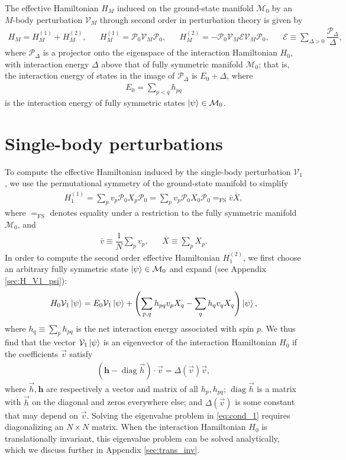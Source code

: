 \documentclass[nofootinbib,notitlepage,11pt]{revtex4-2}
\newcommand{\f}[2]{\dfrac{#1}{#2}} %
\newcommand{\p}[1]{\left(#1\right)} %
\renewcommand{\c}{\cdot} %
\newcommand{\m}{\bm} %
\renewcommand{\v}{\vec} %
\newcommand{\1}{\mathds{1}}
\newcommand{\E}{\mathcal{E}}
\newcommand{\M}{\mathcal{M}}
\renewcommand{\P}{\mathcal{P}}
\newcommand{\V}{\mathcal{V}}
\newcommand{\EQFS}{=_{\text{FS}}}
\newcommand{\col}{\overline}
\DeclareMathOperator{\diag}{diag}
\begin{document}
The effective Hamiltonian $H_M$ induced on the ground-state manifold
$\M_0$ by an $M$-body perturbation $\V_M$ through second order in
perturbation theory is given by\cite{bravyi2011schrieffer,
  perlin2019effective}
\begin{align}
  H_M = H_M^{(1)} + H_M^{(2)},
  &&
  H_M^{(1)} = \P_0 \V_M \P_0,
  &&
  H_M^{(2)} = - \P_0 \V_M \E \V_M \P_0,
  &&
  \E \equiv \sum_{\Delta>0} \f{\P_\Delta}{\Delta},
\end{align}
where $\P_\Delta$ is a projector onto the eigenspace of the
interaction Hamiltonian $H_0$, with interaction energy $\Delta$ above
that of fully symmetric manifold $\M_0$; that is, the interaction
energy of states in the image of $\P_\Delta$ is $E_0+\Delta$, where
\begin{align}
  E_0 = \sum_{p<q} h_{pq}
\end{align}
is the interaction energy of fully symmetric states $\ket\psi\in\M_0$.

\section{Single-body perturbations}
\label{sec:single_body}

To compute the effective Hamiltonian induced by the single-body
perturbation $\V_1$, we use the permutational symmetry of the
ground-state manifold to simplify
\begin{align}
  H_1^{(1)} = \sum_p v_p \P_0 X_p \P_0
  = \sum_p v_p \P_0 X_0 \P_0 \EQFS \bar v \col{X},
  \label{eq:H_1_1}
\end{align}
where $\EQFS$ denotes equality under a restriction to the fully
symmetric manifold $\M_0$, and
\begin{align}
  \bar v \equiv \f1N \sum_p v_p,
  &&
  \col{X} \equiv \sum_p X_p.
\end{align}
In order to compute the second order effective Hamiltonian
$H_1^{(2)}$, we first choose an arbitrary fully symmetric state
$\ket\psi\in\M_0$ and expand (see Appendix \ref{sec:H_V1_psi}):
\begin{align}
  H_0 \V_1 \ket\psi
  = E_0 \V_1 \ket\psi
  + \p{\sum_{p,q} h_{pq} v_p X_q - \sum_q h_q v_q X_q} \ket\psi,
  \label{eq:H_V1_psi}
\end{align}
where $h_q\equiv\sum_p h_{pq}$ is the net interaction energy
associated with spin $p$.  We thus find that the vector $\V_1\ket\psi$
is an eigenvector of the interaction Hamiltonian $H_0$ if the
coefficients $\v v$ satisfy
\begin{align}
  \p{\m h - \diag\v h}\c\v v = \Delta\p{\v v} \v v,
  \label{eq:cond_1}
\end{align}
where $\v h,\m h$ are respectively a vector and matrix of all
$h_p,h_{pq}$; $\diag\v h$ is a matrix with $\v h$ on the diagonal and
zeros everywhere else; and $\Delta\p{\v v}$ is some constant that may
depend on $\v v$.  Solving the eigenvalue problem in \eqref{eq:cond_1}
requires diagonalizing an $N\times N$ matrix.  When the interaction
Hamiltonian $H_0$ is translationally invariant, this eigenvalue
problem can be solved analytically, which we discuss further in
Appendix \ref{sec:trans_inv}.
\end{document}
